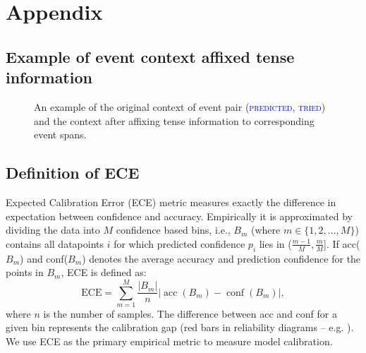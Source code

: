 \documentclass[11pt]{article}
\DeclareMathOperator{\acc}{acc}
\DeclareMathOperator{\conf}{conf}
\begin{document}


\clearpage
\appendix

\section{Appendix}
\label{sec:appendix}
\subsection{Example of event context affixed tense information}
\label{sec:tense_eg}
\begin{figure}[h]
\begin{minipage}{\linewidth}
\noindent
{}
    \caption{An example of the original context of event pair (\textcolor{blue}{\textsc{predicted}}, \textcolor{blue}{\textsc{tried}}) and the context after affixing tense information to corresponding event spans.}
    \label{fig:affix}
\end{minipage}
\end{figure}

\subsection{Definition of ECE}
\label{sec:ece}
Expected Calibration Error (ECE) metric \cite{pmlr-v70-guo17a} measures exactly the difference in expectation between confidence and accuracy. Empirically it is approximated by dividing the data into $M$ confidence based bins, i.e., $B_m$ (where $m \in
\{1, 2, ..., M\}$) contains all datapoints $i$ for which predicted confidence $p_i$ lies in ($\frac{m-1}{M}, \frac{m}{M}$]. If acc($B_m$) and conf($B_m$) denotes the average accuracy and prediction confidence for the points in $B_m$, ECE is defined as:
\begin{equation}
\label{eqn:ece}
\text{ECE} = \sum_{m=1}^{M} \frac{|B_m|}{n} \bigg|\acc(B_m) - \conf(B_m)\bigg|,
\end{equation}
where $n$ is the number of samples.
The difference between acc and conf for a given bin represents the calibration gap (red bars in reliability diagrams – e.g. ). We use ECE as the primary empirical metric to measure model calibration. 
\end{document}
